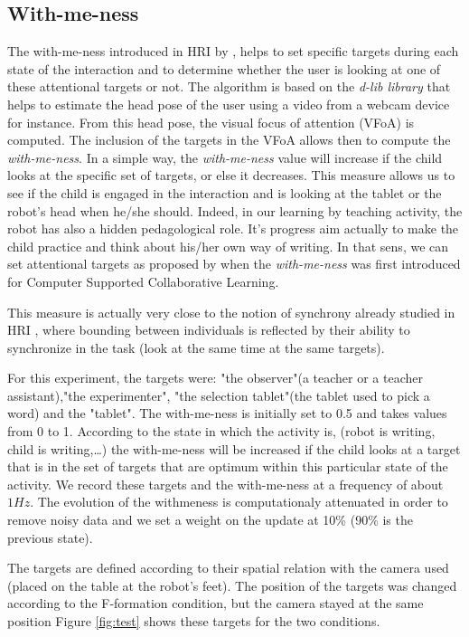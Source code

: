 \documentclass[letterpaper, 10 pt, conference]{ieeeconf}  %
\begin{document}
\subsection{With-me-ness}
The with-me-ness introduced in HRI by \cite{lemaignan2016realtime}, helps to set specific targets during each state of the interaction and to determine whether the user is looking at one of these attentional targets or not.
The algorithm is based on the \textit{d-lib library} that helps to estimate the head pose of the user using a video from a webcam device for instance.
From this head pose, the visual focus of attention (VFoA) is computed.
The inclusion of the targets in the VFoA allows then to compute the \emph{with-me-ness}.
In a simple way, the \emph{with-me-ness} value will increase if the child looks at the specific set of targets, or else it decreases.
This measure allows us to see if the child is engaged in the interaction and is looking at the tablet or the robot's head when he/she should.
Indeed, in our learning by teaching activity, the robot has also a hidden pedagological role. It's progress aim actually to make the child practice and think about his/her own way of writing. 
In that sens, we can set attentional targets as proposed by \cite{sharma2014me} when the \emph{with-me-ness} was first introduced for Computer Supported Collaborative Learning.

This measure is actually very close to the notion of synchrony already studied in HRI \cite{delaherche2012interpersonal}, where bounding between individuals is reflected by their ability to synchronize in the task (look at the same time at the same targets).

For this experiment, the targets were: "the observer"(a teacher or a teacher assistant),"the experimenter",  "the selection tablet"(the tablet used to pick a word) and the "tablet".
The with-me-ness is initially set to 0.5 and takes values from 0 to 1.
According to the state in which the activity is, (robot is writing, child is writing,\dots) the with-me-ness will be increased if the child looks at a target that is in the set of targets that are optimum within this particular state of the activity.
We record these targets and the with-me-ness at a frequency of about $1Hz$.
The evolution of the withmeness is computationaly attenuated in order to remove noisy data and we set a weight on the update at 10\% (90\% is the previous state).


The targets are defined according to their spatial relation with the camera used (placed on the table at the robot's feet).
The position of the targets was changed according to the F-formation condition, but the camera stayed at the same position
Figure \ref{fig:test} shows these targets for the two conditions.
\end{document}
